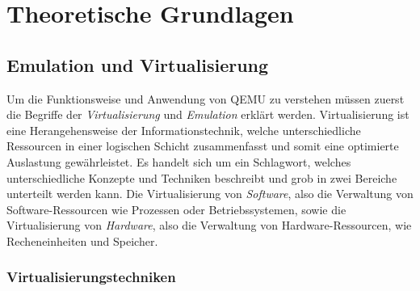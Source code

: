 

\clearpage

\chapter{Theoretische Grundlagen}

\section{Emulation und Virtualisierung}

Um die Funktionsweise und Anwendung von QEMU zu verstehen müssen zuerst die
Begriffe der \textit{Virtualisierung} und \textit{Emulation} erklärt werden.
\newline
Virtualisierung ist eine Herangehensweise der Informationstechnik, welche
unterschiedliche Ressourcen in einer logischen Schicht zusammenfasst und somit
eine optimierte Auslastung
gewährleistet\cite{BSKompakt_Virt}.
Es handelt sich um ein Schlagwort, welches unterschiedliche Konzepte und
Techniken beschreibt und grob in zwei Bereiche unterteilt werden kann.
Die Virtualisierung von \textit{Software}, also die Verwaltung von
Software-Ressourcen wie Prozessen oder Betriebssystemen, sowie die
Virtualisierung von \textit{Hardware}, also die Verwaltung von
Hardware-Ressourcen, wie Recheneinheiten und
Speicher\cite{MasterkursVirtParaSys_Virt}.

\subsection{Virtualisierungstechniken}

